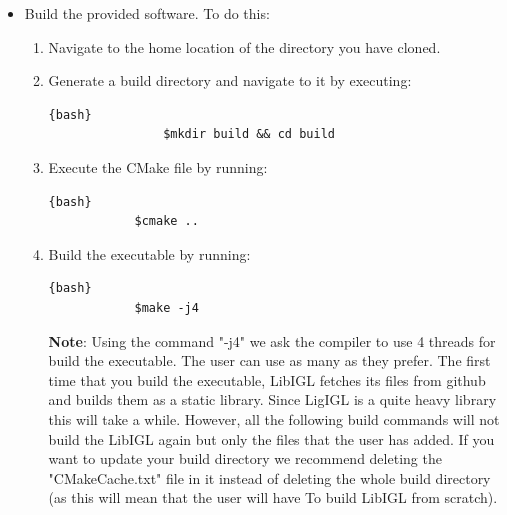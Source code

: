 \begin{itemize}
    \item Build the provided software. To do this:
    \begin{enumerate}
        \item Navigate to the home location of the directory you have cloned. 
        \item Generate a build directory and navigate to it by executing:
            \begin{lstlisting}{bash}
                $mkdir build && cd build
            \end{lstlisting}
        \item Execute the CMake file by running:
        \begin{lstlisting}{bash}
            $cmake ..
        \end{lstlisting}
        \item Build the executable by running:
        \begin{lstlisting}{bash}
            $make -j4
        \end{lstlisting}
        \noindent \textbf{Note}: Using the command "-j4" we ask the compiler 
        to use 4 threads for build the executable. The user can use as many as 
        they prefer. The first time that you build the executable, LibIGL fetches 
        its files from github and builds them as a static library. Since LigIGL 
        is a quite heavy library this will take a while. However, all the 
        following build commands will not build the LibIGL again but only the 
        files that the user has added. If you want to update your build directory 
        we recommend deleting the "CMakeCache.txt" file in it instead of deleting 
        the whole build directory (as this will mean that the user will have To
        build LibIGL from scratch).
    \end{enumerate}
    
\end{itemize}

